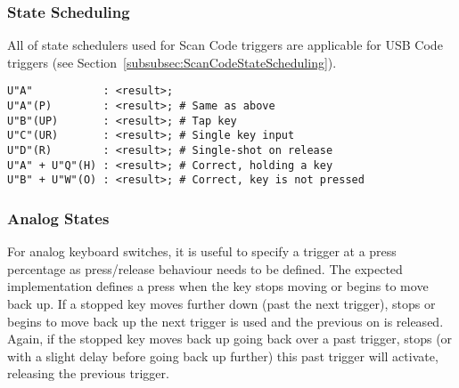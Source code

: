 \documentclass{kiibohd-template}
\begin{document}
\subsubsection{State Scheduling}
\label{subsubsec:trigusbstateschedule}

All of state schedulers used for Scan Code triggers are applicable for USB Code triggers (see Section~\ref{subsubsec:ScanCodeStateScheduling}).

\begin{lstlisting}
U"A"           : <result>;
U"A"(P)        : <result>; # Same as above
U"B"(UP)       : <result>; # Tap key
U"C"(UR)       : <result>; # Single key input
U"D"(R)        : <result>; # Single-shot on release
U"A" + U"Q"(H) : <result>; # Correct, holding a key
U"B" + U"W"(O) : <result>; # Correct, key is not pressed
\end{lstlisting}








\subsubsection{Analog States}

For analog keyboard switches, it is useful to specify a trigger at a press percentage as press/release behaviour needs to be defined.
The expected implementation defines a press when the key stops moving or begins to move back up.
If a stopped key moves further down (past the next trigger), stops or begins to move back up the next trigger is used and the previous on is released.
Again, if the stopped key moves back up going back over a past trigger, stops (or with a slight delay before going back up further) this past trigger will activate, releasing the previous trigger.
\end{document}
